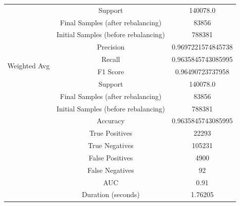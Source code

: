 \begin{longtable}{|c|c|c|}
 & Support & 140078.0 \\
 & Final Samples (after rebalancing) & 83856 \\
 & Initial Samples (before rebalancing) & 788381 \\
\hline
\multirow{4}{*}{Weighted Avg} & Precision & 0.9697221574845738 \\
 & Recall & 0.9635845743085995 \\
 & F1 Score & 0.96490723737958 \\
 & Support & 140078.0 \\
 & Final Samples (after rebalancing) & 83856 \\
 & Initial Samples (before rebalancing) & 788381 \\
\hline
& Accuracy & 0.9635845743085995 \\ \hline
& True Positives & 22293 \\ \hline
& True Negatives & 105231 \\ \hline
& False Positives & 4900 \\ \hline
& False Negatives & 92 \\ \hline
& AUC & 0.91 \\ \hline
& Duration (seconds) & 1.76205 \\ \hline
\end{longtable}


